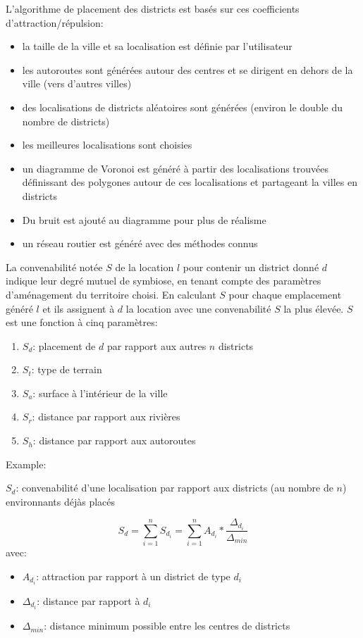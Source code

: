\documentclass[11pt]{article}
\begin{document}
L'algorithme de placement des districts est basés sur ces coefficients d'attraction/répulsion:
\begin{itemize}
	\item la taille de la ville et sa localisation est définie par l'utilisateur
	\item les autoroutes sont générées autour des centres et se dirigent en dehors de la ville (vers d'autres villes)
	\item des localisations de districts aléatoires sont générées (environ le double du nombre de districts)
	\item les meilleures localisations sont choisies
	\item un diagramme de Voronoi est généré à partir des localisations trouvées définissant des polygones autour de ces localisations et partageant la villes en districts
	\item Du bruit est ajouté au diagramme pour plus de réalisme
	\item un réseau routier est généré avec des méthodes connus \cite{parish-01}\newline
\end{itemize}

La convenabilité notée $S$ de la location $l$ pour contenir un district donné $d$ indique leur degré mutuel de symbiose, en tenant compte des paramètres d'aménagement du territoire choisi. En calculant $S$ pour chaque emplacement généré $l$ et ils assignent à $d$ la location avec une convenabilité $S$ la plus élevée.
$S$ est une fonction à cinq paramètres:
\begin{enumerate}
\item $S_d$: placement de $d$ par rapport aux autres $n$ districts
\item $S_t$: type de terrain
\item $S_a$: surface à l'intérieur de la ville
\item $S_r$: distance par rapport aux rivières
\item $S_h$: distance par rapport aux autoroutes\newline
\end{enumerate}

Example: 

$S_d$: convenabilité d'une localisation par rapport aux districts (au nombre de $n$) environnants déjàs placés

\begin{equation}
S_d = \sum_{i=1}^n S_{d_i} = \sum_{i=1}^n A_{d_i}  \ast \frac{\Delta_{d_i}}{\Delta_{min}}
\end{equation}
avec:\newline
\begin{itemize}
\item $A_{d_i}$: attraction par rapport à un district de type $d_i$
\item $\Delta_{d_i}$: distance par rapport à $d_i$
\item $\Delta_{min}$: distance minimum possible entre les centres de districts\newline
\end{itemize}
\end{document}
